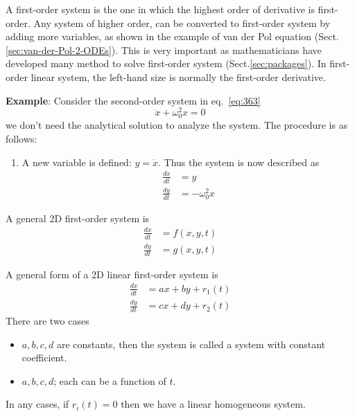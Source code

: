 A first-order system is the one in which the highest order of derivative is
first-order. Any system of higher order, can be converted to first-order system
by adding more variables, as shown in the example of van der Pol equation
(Sect.\ref{sec:van-der-Pol-2-ODEs}).
This is very important as mathematicians have developed many method to solve
first-order system (Sect.\ref{sec:packages}). In first-order linear system, the
left-hand size is normally the first-order derivative.

{\bf Example}: Consider the second-order system in eq.~\eqref{eq:363}
\begin{equation}
  \label{eq:366}
  \ddot{x} + \omega_0^2x=0
\end{equation}
we don't need the analytical solution to analyze the system.  The
procedure is as follows:

\begin{enumerate}
\item A new variable is defined: $y=\dot{x}$. Thus the system is now
  described as
  \begin{equation}
    \label{eq:367}
    \begin{split}
      \frac{dx}{dt} &= y \\
      \frac{dy}{dt} &= -\omega^2_0x
    \end{split}
  \end{equation}
\end{enumerate}

\begin{framed}

A general 2D first-order system is
\begin{equation}
  \label{eq:592}
  \begin{split}
    \frac{dx}{dt} &= f(x,y,t) \\
    \frac{dy}{dt} &= g(x,y,t)
  \end{split}  
\end{equation}
\end{framed}

A general form of a 2D linear first-order system is
\begin{equation}
  \label{eq:593}
  \begin{split}
    \frac{dx}{dt} &= ax+by+r_1(t) \\
    \frac{dy}{dt} &= cx+dy+r_2(t)
  \end{split}    
\end{equation}
There are two cases
\begin{itemize}
\item $a,b,c,d$ are constants, then the system is called a system with
  constant coefficient.
\item $a,b,c,d$; each can be a function of $t$.
\end{itemize}
In any cases, if $r_i(t)=0$ then we have a linear homogeneous system.


